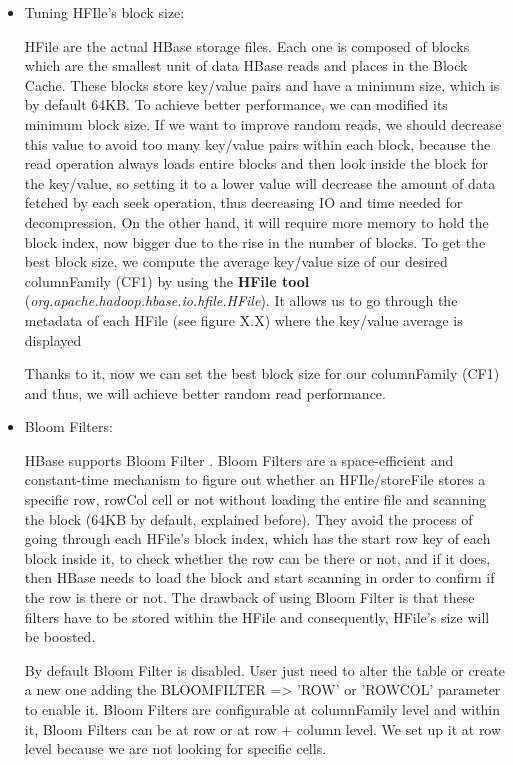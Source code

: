 \begin{itemize}
\item Tuning HFIle's block size:
\par
HFile are the actual HBase storage files. Each one is composed of blocks which are the smallest unit of data HBase reads and places in the Block Cache. These blocks store key/value pairs and have a minimum size, which is by default 64KB. To achieve better performance, we can modified its minimum block size. If we want to improve random reads, we should decrease this value to avoid too many key/value pairs within each block, because the read operation always loads entire blocks and then look inside the block for the key/value, so setting it to a lower value will decrease the amount of data fetched by each seek operation, thus decreasing IO and time needed for decompression. On the other hand, it will require more memory to hold the block index, now bigger due to the rise in the number of blocks.
\bigskip
To get the best block size, we compute the average key/value size of our desired columnFamily (CF1) by using the \textbf{HFile tool} (\textit{org.apache.hadoop.hbase.io.hfile.HFile}). It allows us to go through the metadata of each HFile (see figure X.X) where the key/value average is displayed

\bigskip
{}
\bigskip

Thanks to it, now we can set the best block size for our columnFamily (CF1) and thus, we will achieve better random read performance.

\item Bloom Filters:

HBase supports Bloom Filter \cite{bloom1970space}. Bloom Filters are a space-efficient and constant-time mechanism to figure out whether an HFIle/storeFile stores a specific row, rowCol cell or not without loading the entire file and scanning the block (64KB by default, explained before). They avoid the process of going through each HFile's block index, which has the start row key of each block inside it, to check whether the row can be there or not, and if it does, then HBase needs to load the block and start scanning in order to confirm if the row is there or not. The drawback of using Bloom Filter is that these filters have to be stored within the HFile and consequently, HFile's size will be boosted. 
\par
By default Bloom Filter is disabled. User just need to alter the table or create a new one adding the BLOOMFILTER => 'ROW' or 'ROWCOL' parameter to enable it. Bloom Filters are configurable at columnFamily level and within it, Bloom Filters can be at row or at row + column level. We set up it at row level because we are not looking for specific cells.
\bigskip


\end{itemize}
